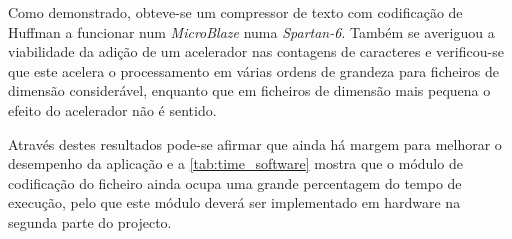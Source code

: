 Como demonstrado, obteve-se um compressor de texto com codificação de Huffman a funcionar num \textit{MicroBlaze} numa \textit{Spartan-6}. Também se averiguou a viabilidade da adição de um acelerador nas contagens de caracteres e verificou-se que este acelera o processamento em várias ordens de grandeza para ficheiros de dimensão considerável, enquanto que em ficheiros de dimensão mais pequena o efeito do acelerador não é sentido.

Através destes resultados pode-se afirmar que ainda há margem para melhorar o desempenho da aplicação e a \autoref{tab:time_software} mostra que o módulo de codificação do ficheiro ainda ocupa uma grande percentagem do tempo de execução, pelo que este módulo deverá ser implementado em hardware na segunda parte do projecto.
